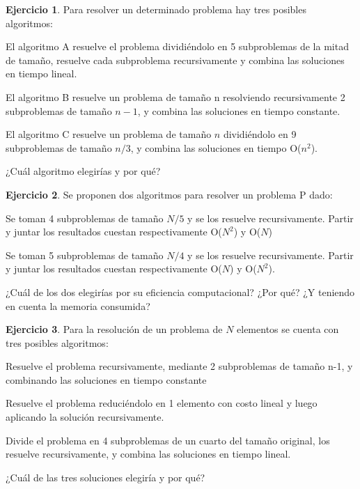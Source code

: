 \documentclass[11pt,a4paper]{article}
\theoremstyle{definition}
\newtheorem{ejercicio}{Ejercicio}[section]
\begin{document}
\begin{ejercicio}
Para resolver un determinado problema hay tres posibles algoritmos:
\begin{partes}
\item El algoritmo A resuelve el problema dividiéndolo en 5 subproblemas de la
mitad de tamaño, resuelve cada subproblema recursivamente y combina las
soluciones en tiempo lineal.
\item El algoritmo B resuelve un problema de tamaño n resolviendo
recursivamente 2 subproblemas de tamaño $n-1$, y combina las soluciones en
tiempo constante.
\item El algoritmo C resuelve un problema de tamaño $n$ dividiéndolo en 9
subproblemas de tamaño $n/3$, y combina las soluciones en tiempo O($n^2$).
\end{partes}
¿Cuál algoritmo elegirías y por qué?
\end{ejercicio}

\begin{ejercicio}
Se proponen dos algoritmos para resolver un problema P dado:
\begin{partes}
\item Se toman 4 subproblemas de tamaño $N/5$ y se los resuelve recursivamente.
Partir y juntar los resultados cuestan respectivamente O($N^2$) y O($N$)
\item Se toman 5 subproblemas de tamaño $N/4$ y se los resuelve recursivamente.
Partir y juntar los resultados cuestan respectivamente O($N$) y O($N^2$).
\end{partes}
¿Cuál de los dos elegirías por su eficiencia computacional? ¿Por qué? ¿Y teniendo en
cuenta la memoria consumida?
\end{ejercicio}

\begin{ejercicio}
Para la resolución de un problema de $N$ elementos se cuenta con tres
posibles algoritmos:
\begin{partes}
\item Resuelve el problema recursivamente, mediante 2 subproblemas de tamaño
n-1, y combinando las soluciones en tiempo constante
\item Resuelve el problema reduciéndolo en 1 elemento con costo lineal y luego
aplicando la solución recursivamente.
\item Divide el problema en 4 subproblemas de un cuarto del tamaño original,
los resuelve recursivamente, y combina las soluciones en tiempo lineal.
\end{partes}
¿Cuál de las tres soluciones elegiría y por qué?
\end{ejercicio}
\end{document}
